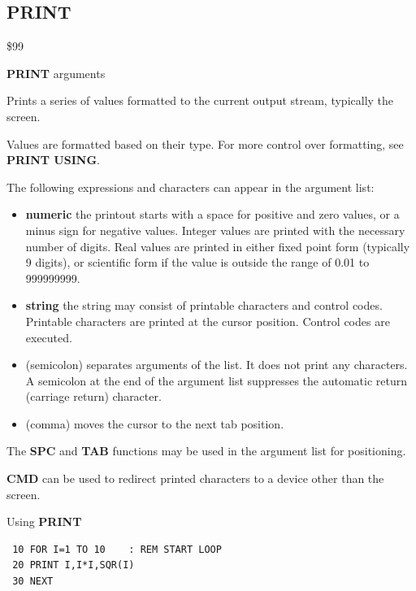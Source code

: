 \subsection{PRINT}
\begin{description}[leftmargin=2cm,style=nextline]
\item [Token:] \$99
\item [Format:] {\bf PRINT} arguments
\item [Usage:]  Prints a series of values formatted to the current output stream, typically the screen.

                Values are formatted based on their type. For more control over formatting,
                see {\bf PRINT USING}.

                The following expressions and characters can appear in the argument list:
                \begin{itemize}
                    \item {\bf numeric} the printout starts with a space
                    for positive and zero values, or a minus sign for
                    negative values. Integer values are printed with
                    the necessary number of digits. Real values are
                    printed in either fixed point form (typically
                    9 digits), or scientific form if the value is
                    outside the range of 0.01 to 999999999.

                    \item {\bf string} the string may consist of printable
                    characters and control codes. Printable characters
                    are printed at the cursor position. Control
                    codes are executed.

                    \item \screentext{;} (semicolon) separates
                    arguments of the list. It does not print any characters.
                    A semicolon at the end of the argument list suppresses
                    the automatic return (carriage return) character.

                    \item \screentext{,} (comma) moves the cursor to the next
                    tab position.
                  \end{itemize}
\item [Remarks:] The {\bf SPC} and {\bf TAB} functions
                 may be used in the argument list
                 for positioning.

                 {\bf CMD} can be used to redirect printed characters to a
                 device other than the screen.

\item [Example:] Using {\bf PRINT}

\begin{tcolorbox}[colback=black,coltext=white]
\verbatimfont{\codefont}
\begin{verbatim}
 10 FOR I=1 TO 10    : REM START LOOP
 20 PRINT I,I*I,SQR(I)
 30 NEXT
\end{verbatim}
\end{tcolorbox}
\end{description}

